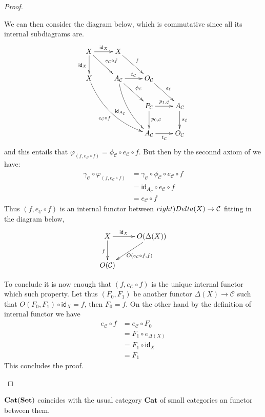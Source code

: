 \documentclass[a4paper,UKenglish,cleveref,pdftex,thm-restate,numberwithinsect]{lipics-v2021}
\newcommand{\cat}[1]{\ensuremath{\mathbf{#1}}}
\newcommand{\cate}[1]{\mathbf{Cat}(\cat{#1})}
\newcommand{\id}[1]{\mathsf{id}_{#1}}
\def\X{\textbf {\textup{X}}}
\def\Set{\textbf {\textup{Set}}}
\begin{document}
\begin{proof}
\begin{enumerate}
	We can then consider the diagram below, which is commutative since all its internal subdiagrams are.
		\[\xymatrix{X\ar[r]^{\id{X}}  \ar[d]_{\id{X}} \ar[dr]^{e_{\mathcal{C}}\circ  f}& X \ar[dr]^{f}\\X \ar@/_.5cm/[ddrr]_{e_{\mathcal{C}}\circ f}&A_{\mathcal{C}} \ar@/_.3cm/[ddr]_{\id{A_{\mathcal{C}}}} \ar[r]^{t_{\mathcal{C}}}\ar@{>}[dr]^{\phi_{\mathcal{C}}} & O_{\mathcal{C}} \ar[dr]^{e_{\mathcal{C}}}  \\ && P_{\mathcal{C}} \ar[r]^{p_{1, \mathcal{C}}} \ar[d]^{p_{0, \mathcal{C}}}& A_{\mathcal{C}} \ar[d]^{s_{\mathcal{C}}} \\ && A_{\mathcal{C}} \ar[r]_{t_{\mathcal{C}}}& O_{\mathcal{C}} }\]
	and this entails that $\varphi_{(f, e_{\mathcal{C}}\circ f)}=\phi_{\mathcal{C}}\circ e_{\mathcal{C}}\circ f$. But then by the seconnd axiom of  we have:
	\begin{align*}
		\gamma_{\mathcal{C}}\circ \varphi_{(f, e_{\mathcal{C}}\circ f)} & = \gamma_{\mathcal{C}} \circ \phi_{\mathcal{C}}\circ e_{\mathcal{C}}\circ f\\&= \id{A_{\mathcal{C}}}\circ e_{\mathcal{C}}\circ f\\&= e_{\mathcal{C}}\circ f
	\end{align*}
	Thus $(f, e_{\mathcal{C}}\circ f)$ is an internal functor between $\\right) Delta(X)\to \mathcal{C}$ fitting in the diagram below,
	\[\xymatrix{X \ar[r]^-{\id{X}} \ar[d]_{f}& O(\Delta(X)) \ar[dl]^{O(e_{\mathcal{C}}\circ f, f)}\\ O(\mathcal{C})}\]
	
	To conclude it is now enough that $(f, e_{\mathcal{C}}\circ f)$ is the unique internal functor which such property. Let thus $(F_0, F_1)$ be another functor $\Delta(X)\to \mathcal{C}$ such that $O(F_0, F_1)\circ \id{X}=f$, then $F_0=f$.  On the other hand by the definition of internal functor we have
	\begin{align*}
	e_{\mathcal{C}}\circ f &=  e_{\mathcal{C}}\circ F_0\\&=	F_1\circ e_{\Delta(X)}\\&= F_1\circ \id{X} \\&= F_1 
	\end{align*}
	This concludes the proof. \qedhere 
	\end{enumerate}	
	\end{proof} 

\begin{remark}\label{rem:set1}
	$\cate{\Set}$ coincides with the usual category $\cat{Cat}$ of small categories an functor between them. 
\end{remark}
\end{document}
